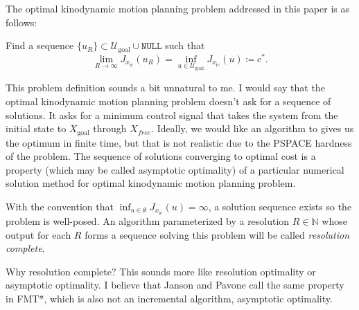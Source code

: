 \documentclass{llncs}
\newcommand{\NULL}{\ensuremath{\mathtt{NULL}}\xspace}
\newcommand{\mcmargin}[2]{{\color{red}#1}\marginpar{\raggedright\footnotesize\color{red}[MC] #2}}
\begin{document}
The optimal kinodynamic motion planning problem addressed \mcmargin{in this paper}{} is as follows:
% 
\begin{problem}\label{Problem}
Find a sequence $\{u_{R}\}\subset\mathcal{U}_\mathrm{goal}\cup \NULL$ such that 
%
\begin{equation}
\lim_{R\rightarrow\infty}J_{x_\mathrm{ic}}(u_R)=\inf_{u\in\mathcal{U}_\mathrm{goal}}J_{x_\mathrm{ic}}(u)\coloneqq c^{*}.\label{eq:meaningful_problem}
\end{equation}
%

\mcmargin{This problem definition sounds a bit unnatural to me. I would say that the optimal kinodynamic motion planning problem doesn't ask for a sequence of solutions. It asks for a minimum control signal that takes the system from the initial state to $X_\mathrm{goal}$ through $X_{free}$. Ideally, we would like an algorithm to gives us the optimum in finite time, but that is not realistic due to the PSPACE hardness of the problem. The sequence of solutions converging to optimal cost is a property (which may be called asymptotic optimality) of a particular numerical solution method for optimal kinodynamic motion planning problem.}{}

%
With the convention that $\inf_{u\in\emptyset}J_{x_\mathrm{ic}}(u)=\infty$, a solution sequence exists so the problem is well-posed. An algorithm parameterized by a resolution $R \in \mathbb{N}$ whose output for each $R$ forms a sequence solving this problem will be called \textit{resolution complete}.

\mcmargin{Why resolution complete? This sounds more like resolution optimality or asymptotic optimality. I believe that Janson and Pavone call the same property in FMT*, which is also not an incremental algorithm, asymptotic optimality.}{}

\end{problem}
\end{document}
